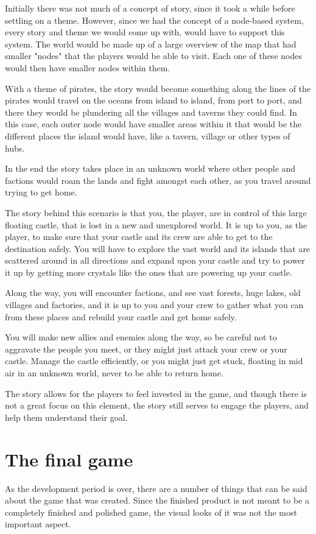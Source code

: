 Initially there was not much of a concept of story, since it took a while before settling on a theme. 
However, since we had the concept of a node-based system, every story and theme we would come up with, would have to support this system. The world would be made up of a large overview of the map that had smaller "nodes" that the players would be able to visit. Each one of these nodes would then have smaller nodes within them.

With a theme of pirates, the story would become something along the lines of the pirates would travel on the oceans from island to island, from port to port, and there they would be plundering all the villages and taverns they could find. In this case, each outer node would have smaller areas within it that would be the different places the island would have, like a tavern, village or other types of hubs. 

In the end the story takes place in an unknown world where other people and factions would roam the lands and fight amongst each other, as you travel around trying to get home. 

The story behind this scenario is that you, the player, are in control of this large floating castle, that is lost in a new and unexplored world. 
It is up to you, as the player, to make sure that your castle and its crew are able to get to the destination safely. You will have to explore the vast world and its islands that are scattered around in all directions and expand upon your castle and try to power it up by getting more crystals like the ones that are powering up your castle.

Along the way, you will encounter factions, and see vast forests, huge lakes, old villages and factories, and it is up to you and your crew to gather what you can from these places and rebuild your castle and get home safely. 

You will make new allies and enemies along the way, so be careful not to aggravate the people you meet, or they might just attack your crew or your castle. Manage the castle efficiently, or you might just get stuck, floating in mid air in an unknown world, never to be able to return home.

The story allows for the players to feel invested in the game, and though there is not a great focus on this element, the story still serves to engage the players, and help them understand their goal.

\section{The final game}
As the development period is over, there are a number of things that can be said about the game that was created. Since the finished product is not meant to be a completely finished and polished game, the visual looks of it was not the most important aspect. 


